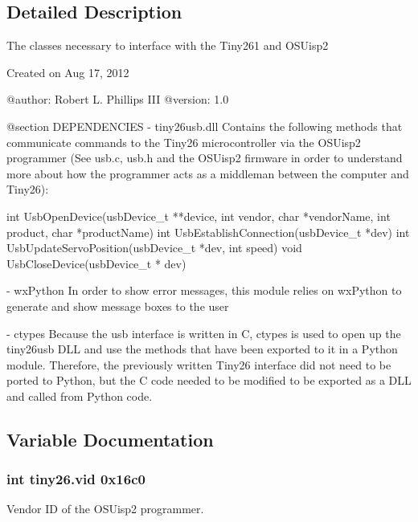 \subsection{Detailed Description}
\begin{DoxyVerb}The classes necessary to interface with the Tiny261 and OSUisp2

Created on Aug 17, 2012

@author: Robert L. Phillips III
@version: 1.0

@section DEPENDENCIES  
    -  tiny26usb.dll
         Contains the following methods that communicate commands to the Tiny26 microcontroller via
         the OSUisp2 programmer (See usb.c, usb.h and the OSUisp2 firmware in order to understand more
         about how the programmer acts as a middleman between the computer and Tiny26):
         
                int UsbOpenDevice(usbDevice_t **device, int vendor, char *vendorName, int product, char *productName)
                int UsbEstablishConnection(usbDevice_t *dev)
                int UsbUpdateServoPosition(usbDevice_t *dev, int speed)
                void UsbCloseDevice(usbDevice_t * dev)
                
    -  wxPython
          In order to show error messages, this module relies on wxPython to generate and show message
          boxes to the user
          
    -  ctypes
          Because the usb interface is written in C, ctypes is used to open up the tiny26usb DLL and
          use the methods that have been exported to it in a Python module.  Therefore, the previously
          written Tiny26 interface did not need to be ported to Python, but the C code needed to be
          modified to be exported as a DLL and called from Python code.\end{DoxyVerb}
 

\subsection{Variable Documentation}
\hypertarget{namespacetiny26_abc82c52a7ef052100f1d62dd9513dde2}{
\subsubsection[{vid}]{\setlength{\rightskip}{0pt plus 5cm}int tiny26.\-vid 0x16c0}}\label{namespacetiny26_abc82c52a7ef052100f1d62dd9513dde2}


Vendor I\-D of the O\-S\-Uisp2 programmer. 

